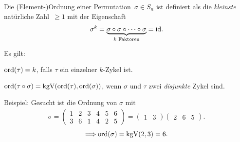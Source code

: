 \documentclass{../../algblatt}
\begin{document}
Die (Element-)Ordnung einer Permutation~$\sigma \in S_n$ ist definiert als die
\emph{kleinste} natürliche Zahl~$\geq 1$ mit der
Eigenschaft
\[ \sigma^k=\underbrace{\sigma \circ \sigma \circ \cdots \circ
\sigma}_{\text{$k$ Faktoren}}= \mathrm{id}. \]

Es gilt:
\begin{description}
\item $\operatorname{ord}(\tau)=k$, falls $\tau$ ein einzelner $k$-Zykel ist.
\item $\operatorname{ord}(\tau \circ \sigma)=\operatorname{kgV}(\operatorname{ord}(\tau), \operatorname{ord}(\sigma))$, wenn $\sigma$ und
$\tau$ zwei \emph{disjunkte} Zykel sind.
\end{description}

Beispiel: Gesucht ist die Ordnung von $\sigma$ mit
\begin{align*}
\sigma=
\begin{pmatrix}
1 & 2 & 3 & 4 & 5 & 6\\
3 & 6 & 1 & 4 & 2 & 5
\end{pmatrix}
=
\begin{pmatrix}
1 & 3 
\end{pmatrix}
\begin{pmatrix}
2 & 6 & 5
\end{pmatrix}\!.
\end{align*}
\[ \Longrightarrow \operatorname{ord}(\sigma) = \operatorname{kgV}(2,3)=6. \]
\end{document}
